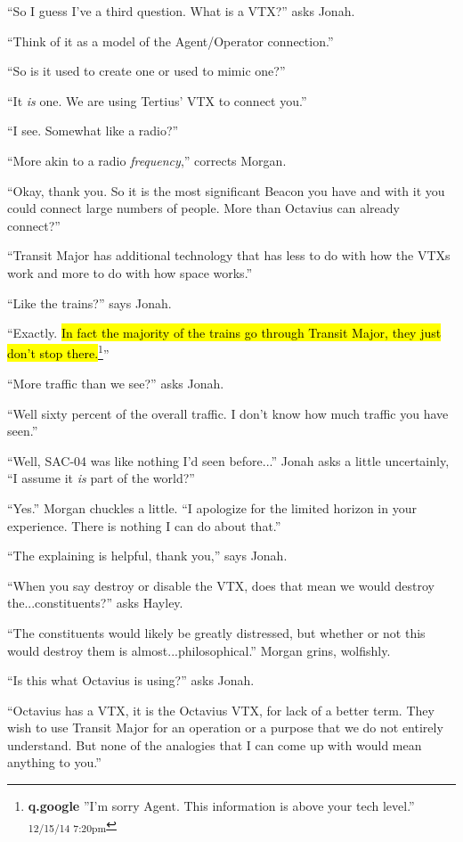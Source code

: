``So I guess I've a third question.  What is a VTX?'' asks Jonah.

``Think of it as a model of the Agent/Operator connection.''

``So is it used to create one or used to mimic one?''

``It \textit{is} one. We are using Tertius' VTX to connect you.''

``I see.  Somewhat like a radio?''

``More akin to a radio \textit{frequency},'' corrects Morgan.

``Okay, thank you.  So it is the most significant Beacon you have and with it you could connect large numbers of people.  More than Octavius can already connect?''

``Transit Major has additional technology that has less to do with how the VTXs work and more to do with how space works.''

``Like the trains?'' says Jonah.

``Exactly.  \hl{In fact the majority of the trains go through Transit Major, they just don't stop there.}\footnote{\textbf{q.google }''I'm sorry Agent.  This information is above your tech level.'' \textsubscript{12/15/14 7:20pm}}''

``More traffic than we see?'' asks Jonah.

``Well sixty percent of the overall traffic.  I don't know how much traffic you have seen.''

``Well, SAC-04 was like nothing I'd seen before...'' Jonah asks a little uncertainly, ``I assume it \textit{is} part of the world?''

``Yes.'' Morgan chuckles a little.  ``I apologize for the limited horizon in your experience.  There is nothing I can do about that.''

``The explaining is helpful, thank you,'' says Jonah.

``When you say destroy or disable the VTX, does that mean we would destroy the...constituents?'' asks Hayley.

``The constituents would likely be greatly distressed, but whether or not this would destroy them is almost...philosophical.''  Morgan grins, wolfishly.

``Is this what Octavius is using?'' asks Jonah.

``Octavius has a VTX, it is the Octavius VTX, for lack of a better term.  They wish to use Transit Major for an operation or a purpose that we do not entirely understand. But none of the analogies that I can come up with would mean anything to you.''

